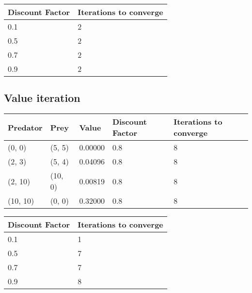 \documentclass{article}
\begin{document}

\begin{center}
	\begin{tabular}{ l || l }
		Discount Factor & Iterations to converge \\ 
		\hline
		0.1 & 2 \\
		0.5 & 2 \\
		0.7 & 2 \\
		0.9 & 2 \\	
	\end{tabular}
\end{center}


\subsection*{Value iteration}



\begin{center}
	\begin{tabular}{ l | l | l | l | l }
		Predator & Prey & Value & Discount Factor & Iterations to converge \\ 
		\hline
		(0, 0) & (5, 5) & 0.00000 & 0.8 & 8 \\
		(2, 3) & (5, 4) & 0.04096 & 0.8 & 8 \\
		(2, 10) & (10, 0) & 0.00819 & 0.8 & 8 \\
		(10, 10) & (0, 0) & 0.32000 & 0.8 & 8 \\	
	\end{tabular}
\end{center}


\begin{center}
	\begin{tabular}{ l || l }
		Discount Factor & Iterations to converge \\ 
		\hline
		0.1 & 1 \\
		0.5 & 7 \\
		0.7 & 7 \\
		0.9 & 8 \\	
	\end{tabular}
\end{center}
\end{document}
